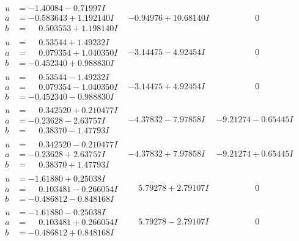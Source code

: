 \documentclass[1p]{elsarticle_modified}
\theoremstyle{definition}
\begin{document}
$$\begin{array}{c|c|c}
\begin{aligned}
u &= -1.40084 - 0.71997 I \\
a &= -0.583643 + 1.192140 I \\
b &= \phantom{-}0.503553 + 1.198140 I\end{aligned}
 & -0.94976 + 10.68140 I & \phantom{-0.000000 } 0 \\ \hline\begin{aligned}
u &= \phantom{-}0.53544 + 1.49232 I \\
a &= \phantom{-}0.079354 + 1.040350 I \\
b &= -0.452340 + 0.988830 I\end{aligned}
 & -3.14475 - 4.92454 I & \phantom{-0.000000 } 0 \\ \hline\begin{aligned}
u &= \phantom{-}0.53544 - 1.49232 I \\
a &= \phantom{-}0.079354 - 1.040350 I \\
b &= -0.452340 - 0.988830 I\end{aligned}
 & -3.14475 + 4.92454 I & \phantom{-0.000000 } 0 \\ \hline\begin{aligned}
u &= \phantom{-}0.342520 + 0.210477 I \\
a &= -0.23628 - 2.63757 I \\
b &= \phantom{-}0.38370 - 1.47793 I\end{aligned}
 & -4.37832 - 7.97858 I & -9.21274 - 0.65445 I \\ \hline\begin{aligned}
u &= \phantom{-}0.342520 - 0.210477 I \\
a &= -0.23628 + 2.63757 I \\
b &= \phantom{-}0.38370 + 1.47793 I\end{aligned}
 & -4.37832 + 7.97858 I & -9.21274 + 0.65445 I \\ \hline\begin{aligned}
u &= -1.61880 + 0.25038 I \\
a &= \phantom{-}0.103481 - 0.266054 I \\
b &= -0.486812 - 0.848168 I\end{aligned}
 & \phantom{-}5.79278 + 2.79107 I & \phantom{-0.000000 } 0 \\ \hline\begin{aligned}
u &= -1.61880 - 0.25038 I \\
a &= \phantom{-}0.103481 + 0.266054 I \\
b &= -0.486812 + 0.848168 I\end{aligned}
 & \phantom{-}5.79278 - 2.79107 I & \phantom{-0.000000 } 0 \\ \hline\begin{aligned}

\end{aligned}
\end{array}$$
\end{document}

